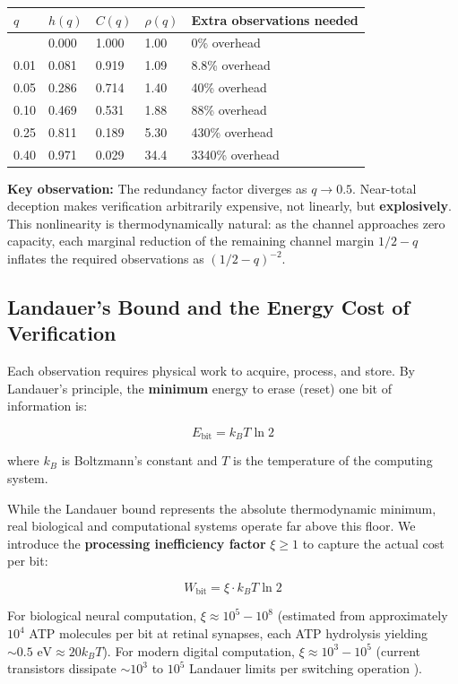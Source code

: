 \documentclass[11pt]{article}
\theoremstyle{plain}
\theoremstyle{definition}
\theoremstyle{remark}
\newcounter{none}
\let\origsubsection\subsection
\renewcommand{\subsection}{\needspace{7\baselineskip}\origsubsection}
\begin{document}
{\def\LTcaptype{none} %
\begin{longtable}[]{@{}lllll@{}}
\toprule\noalign{}
\(q\) & \(h(q)\) & \(C(q)\) & \(\rho(q)\) & Extra observations needed \\
\midrule\noalign{}
\endhead
\bottomrule\noalign{}
\endlastfoot
0.00 & 0.000 & 1.000 & 1.00 & 0\% overhead \\
0.01 & 0.081 & 0.919 & 1.09 & 8.8\% overhead \\
0.05 & 0.286 & 0.714 & 1.40 & 40\% overhead \\
0.10 & 0.469 & 0.531 & 1.88 & 88\% overhead \\
0.25 & 0.811 & 0.189 & 5.30 & 430\% overhead \\
0.40 & 0.971 & 0.029 & 34.4 & 3340\% overhead \\
\end{longtable}
}

\textbf{Key observation:} The redundancy factor diverges as
\(q \to 0.5\). Near-total deception makes verification arbitrarily
expensive, not linearly, but \textbf{explosively}. This nonlinearity is
thermodynamically natural: as the channel approaches zero capacity, each
marginal reduction of the remaining channel margin \(1/2 - q\) inflates
the required observations as \((1/2 - q)^{-2}\).

\subsection{Landauer's Bound and the Energy Cost of
Verification}\label{landauers-bound-and-the-energy-cost-of-verification}

Each observation requires physical work to acquire, process, and store.
By Landauer's principle, the \textbf{minimum} energy to erase (reset)
one bit of information is:

\[E_{\text{bit}} = k_B T \ln 2\]

where \(k_B\) is Boltzmann's constant and \(T\) is the temperature of
the computing system.

While the Landauer bound represents the absolute thermodynamic minimum,
real biological and computational systems operate far above this floor.
We introduce the \textbf{processing inefficiency factor} \(\xi \geq 1\)
to capture the actual cost per bit:

\[W_{\text{bit}} = \xi \cdot k_B T \ln 2\]

For biological neural computation, \(\xi \approx 10^5 - 10^8\)
\citep{Laughlin1998} (estimated from approximately \(10^4\) ATP
molecules per bit at retinal synapses, each ATP hydrolysis yielding
\(\sim 0.5 \text{ eV} \approx 20 k_B T\)). For modern digital
computation, \(\xi \approx 10^3 - 10^5\) (current transistors dissipate
\(\sim 10^3\) to \(10^5\) Landauer limits per switching operation
\citep{Frank2002}).
\end{document}
